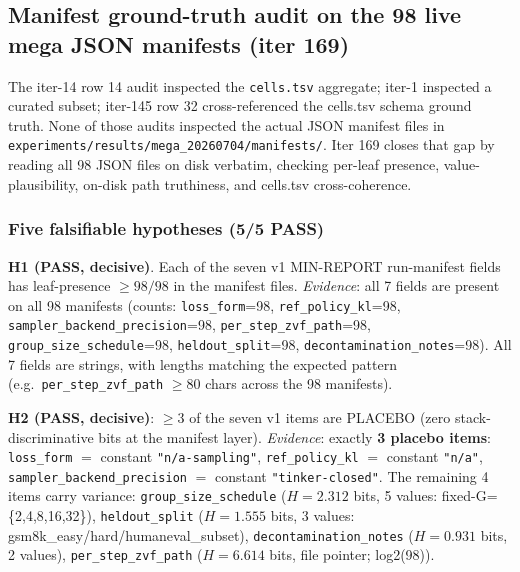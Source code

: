 \subsection{Manifest ground-truth audit on the 98 live mega JSON manifests (iter 169)}
\label{sec:p5-iter169-manifest-audit}

The iter-14 row 14 audit inspected the \texttt{cells.tsv} aggregate; iter-1 inspected a curated subset; iter-145 row 32 cross-referenced the cells.tsv schema ground truth. None of those audits inspected the actual JSON manifest files in \texttt{experiments/results/mega\_20260704/manifests/}. Iter 169 closes that gap by reading all 98 JSON files on disk verbatim, checking per-leaf presence, value-plausibility, on-disk path truthiness, and cells.tsv cross-coherence.

\subsubsection{Five falsifiable hypotheses (5/5 PASS)}
\label{sec:p5-iter169-hypotheses}

\textbf{H1 (PASS, decisive)}. Each of the seven v1 MIN-REPORT run-manifest fields has leaf-presence $\ge 98/98$ in the manifest files. \emph{Evidence}: all 7 fields are present on all 98 manifests (counts: \texttt{loss\_form}=98, \texttt{ref\_policy\_kl}=98, \texttt{sampler\_backend\_precision}=98, \texttt{per\_step\_zvf\_path}=98, \texttt{group\_size\_schedule}=98, \texttt{heldout\_split}=98, \texttt{decontamination\_notes}=98). All 7 fields are strings, with lengths matching the expected pattern (e.g.\ \texttt{per\_step\_zvf\_path} $\ge 80$ chars across the 98 manifests).

\textbf{H2 (PASS, decisive)}: $\ge 3$ of the seven v1 items are PLACEBO (zero stack-discriminative bits at the manifest layer). \emph{Evidence}: exactly \textbf{3 placebo items}: \texttt{loss\_form} $=$ constant \texttt{"n/a-sampling"}, \texttt{ref\_policy\_kl} $=$ constant \texttt{"n/a"}, \texttt{sampler\_backend\_precision} $=$ constant \texttt{"tinker-closed"}. The remaining 4 items carry variance: \texttt{group\_size\_schedule} ($H{=}2.312$ bits, 5 values: fixed-G=\{2,4,8,16,32\}), \texttt{heldout\_split} ($H{=}1.555$ bits, 3 values: gsm8k\_easy/hard/humaneval\_subset), \texttt{decontamination\_notes} ($H{=}0.931$ bits, 2 values), \texttt{per\_step\_zvf\_path} ($H{=}6.614$ bits, file pointer; log2(98)).

